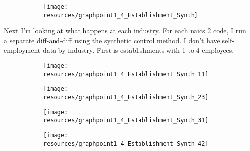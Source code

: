 \documentclass[12pt]{article}
\begin{document}
\begin{figure}[H]
	\centering
	\begin{subfigure}[b]{0.4\textwidth}
	    \texttt{[image: resources/graphpoint1\_4\_Establishment\_Synth]}
	\end{subfigure}
\end{figure}

\pagebreak

Next I'm looking at what happens at each industry. For each naics 2 code, I run a separate diff-and-diff using the synthetic control method. I don't have self-employment data by industry. First is establishments with 1 to 4 employees. 

\begin{center}
	\centering
	
\end{center}

\begin{center}
	\centering
	
\end{center}

\begin{center}
	\centering
	
\end{center}

\begin{center}
	\centering
	
\end{center}


\begin{figure}[H]
	\centering
	\begin{subfigure}[b]{0.4\textwidth}
	    \texttt{[image: resources/graphpoint1\_4\_Establishment\_Synth\_11]}
	\end{subfigure}
	\begin{subfigure}[b]{0.4\textwidth}
		  \texttt{[image: resources/graphpoint1\_4\_Establishment\_Synth\_23]}
	\end{subfigure}
\end{figure}

\begin{figure}[H]
	\centering
	\begin{subfigure}[b]{0.4\textwidth}
	    \texttt{[image: resources/graphpoint1\_4\_Establishment\_Synth\_31]}
	\end{subfigure}
	\begin{subfigure}[b]{0.4\textwidth}
		  \texttt{[image: resources/graphpoint1\_4\_Establishment\_Synth\_42]}
	\end{subfigure}
\end{figure}
\end{document}
